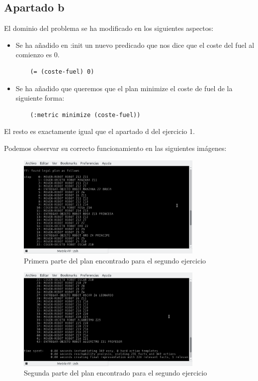 \subsection{Apartado b}
El dominio del problema se ha modificado en los siguientes aspectos:
\begin{itemize}
	\item Se ha añadido en :init un nuevo predicado que nos dice que el coste del fuel al comienzo es 0.
	\begin{verbatim}
	(= (coste-fuel) 0)
	\end{verbatim}
	\item Se ha añadido que queremos que el plan minimize el coste de fuel de la siguiente forma:
	\begin{verbatim}
	(:metric minimize (coste-fuel))
	\end{verbatim}
\end{itemize}
El resto es exactamente igual que el apartado d del ejercicio 1.

Podemos observar su correcto funcionamiento en las siguientes imágenes:
\begin{figure}[H]
	\centering
	\includegraphics[width=0.8\textwidth]{img3}
	\caption{Primera parte del plan encontrado para el segundo ejercicio}
\end{figure}
\begin{figure}[H]
	\centering
	\includegraphics[width=0.8\textwidth]{img4}
	\caption{Segunda parte del plan encontrado para el segundo ejercicio}
\end{figure}
